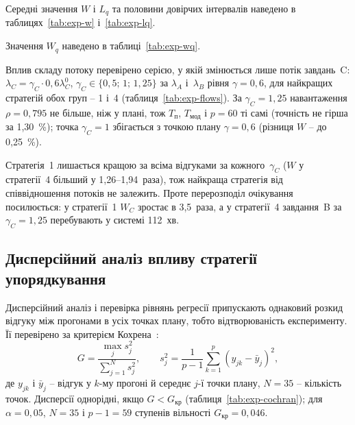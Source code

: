 Середні значення $W$ і $L_q$ та половини довірчих інтервалів наведено в
таблицях~\ref{tab:exp-w} і~\ref{tab:exp-lq}.




Значення $W_q$ наведено в таблиці~\ref{tab:exp-wq}.



Вплив складу потоку перевірено серією, у якій змінюється лише потік завдань~C:
$\lambda_C = \gamma_C\cdot0{,}6\lambda_C^0$, $\gamma_C \in \{0{,}5;\,1;\,1{,}25\}$ за $\lambda_A$
і~$\lambda_B$ рівня $\gamma = 0{,}6$, для найкращих стратегій обох груп -- 1 і~4
(таблиця~\ref{tab:exp-flows}). За $\gamma_C = 1{,}25$ навантаження $\rho = 0{,}795$ не більше,
ніж у плані, тож $T_{\text{п}}$, $T_{\text{мод}}$ і $p = 60$ ті самі (точність не гірша за 1,30~\%);
точка $\gamma_C = 1$ збігається з точкою плану $\gamma = 0{,}6$ (різниця $W$ -- до 0,25~\%).



Стратегія~1 лишається кращою за всіма відгуками за кожного~$\gamma_C$ ($W$ у стратегії~4 більший
у 1,26--1,94~раза), тож найкраща стратегія від співвідношення потоків не залежить. Проте
перерозподіл очікування посилюється: у стратегії~1 $W_C$ зростає в 3,5~раза, а у стратегії~4
завдання~B за $\gamma_C = 1{,}25$ перебувають у системі 112~хв.

\subsection{Дисперсійний аналіз впливу стратегії упорядкування}\label{sec:exp-anova}

Дисперсійний аналіз і перевірка рівнянь регресії припускають однаковий розкид відгуку між
прогонами в усіх точках плану, тобто відтворюваність експерименту. Її перевірено за критерієм
Кохрена~\cite{stetsenko-modeling}:
\begin{equation}\label{eq:cochran}
  G = \frac{\max_j s_j^2}{\sum_{j=1}^{N} s_j^2}, \qquad
  s_j^2 = \frac{1}{p-1}\sum_{k=1}^{p}\left(y_{jk} - \bar y_j\right)^2,
\end{equation}
де $y_{jk}$ і $\bar y_j$ -- відгук у $k$-му прогоні й середнє $j$-ї точки плану, $N = 35$ --
кількість точок. Дисперсії однорідні, якщо $G < G_{\text{кр}}$ (таблиця~\ref{tab:exp-cochran}); для $\alpha = 0{,}05$, $N = 35$ і
$p - 1 = 59$ ступенів вільності $G_{\text{кр}} = 0{,}046$.



